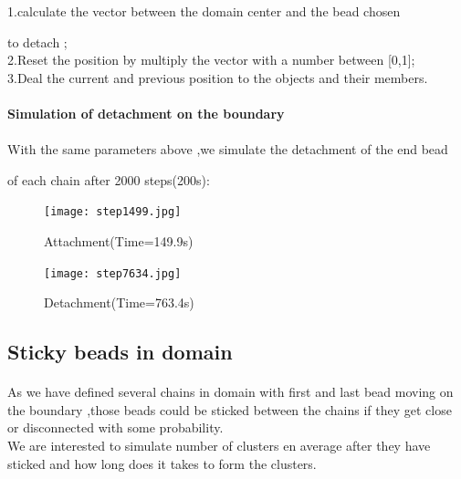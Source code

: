\documentclass{article}
\begin{document}
1.calculate the vector between the domain center and the bead chosen 

to detach ;\\

2.Reset the position by multiply the vector with a number between [0,1];\\

3.Deal the current and previous position to the objects and their members.\\
\paragraph{Simulation of detachment on the boundary}
\paragraph{}
 With the same parameters above ,we simulate the detachment of the end bead
 
 of each chain  after 2000 steps(200s):\\
\begin{figure}[H]
	\begin{minipage}[t]{0.5\textwidth}
		\centering
		\texttt{[image: step1499.jpg]}	
		\caption{Attachment(Time=149.9s)}
	\end{minipage}%
	\begin{minipage}[t]{1.1\textwidth}
		\centering
		\texttt{[image: step7634.jpg]}
		\caption{Detachment(Time=763.4s)}
	\end{minipage}
\end{figure}
\subsection{Sticky beads in domain}
\paragraph{}
As we have defined several chains in domain with first and last bead moving on the boundary ,those beads could be sticked between the chains if they get close or disconnected with some probability.\\

We are interested to simulate number of clusters en average after they have sticked and how long does it takes to form the clusters.  
\end{document}
